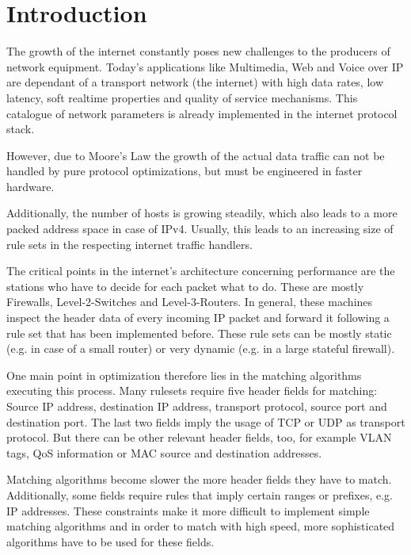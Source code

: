 \documentclass[a4paper,
		12pt,
		parskip=full,
		titlepage
		]{scrartcl}
\begin{document}


\setcounter{page}{1}
\tableofcontents{}

\pagebreak

\pagestyle{scrheadings}

\section{Introduction}
The growth of the internet constantly poses new challenges to the producers of network equipment.
Today's applications like Multimedia, Web and Voice over IP are dependant of a transport network (the internet) with
high data rates, low latency, soft realtime properties and quality of service mechanisms.
This catalogue of network parameters is already implemented in the internet protocol stack.

However, due to Moore's Law the growth of the actual data traffic can not be handled by pure protocol optimizations, 
but must be engineered in faster hardware.

Additionally, the number of hosts is growing steadily, which also leads to a more packed address space in case of IPv4.
Usually, this leads to an increasing size of rule sets in the respecting internet traffic handlers. %

The critical points in the internet's architecture concerning performance are the stations who have to decide for each packet what to do.
These are mostly Firewalls, Level-2-Switches and Level-3-Routers.
In general, these machines inspect the header data of every incoming IP packet and forward it following a rule set that has been implemented before.
These rule sets can be mostly static (e.g. in case of a small router) or very dynamic (e.g. in a large stateful firewall).

One main point in optimization therefore lies in the matching algorithms executing this process.
Many rulesets require five header fields for matching: Source IP address, destination IP address, transport protocol, source port and destination port.
The last two fields imply the usage of TCP or UDP as transport protocol.
But there can be other relevant header fields, too, for example VLAN tags, QoS information or MAC source and destination addresses.

Matching algorithms become slower the more header fields they have to match.
Additionally, some fields require rules that imply certain ranges or prefixes, e.g. IP addresses.
These constraints make it more difficult to implement simple matching algorithms and in order to match with high speed, more sophisticated
algorithms have to be used for these fields.
\end{document}
